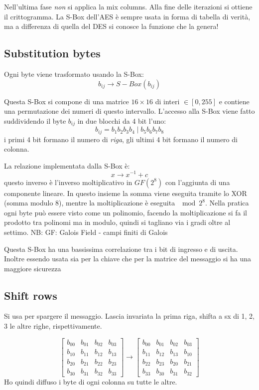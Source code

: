 Nell'ultima fase \emph{non} si applica la mix columns. Alla fine delle iterazioni si ottiene il crittogramma.
La S-Box dell'AES è sempre usata in forma di tabella di verità, ma a differenza di quella del DES si conosce la funzione che la genera!

\subsection{Substitution bytes}
Ogni byte viene trasformato usando la S-Box:
$$ b_{ij} \xrightarrow{} S-Box(b_{ij}) $$

Questa S-Box si compone di una matrice $16 \times 16$ di interi $\in [0, 255]$ e contiene una permutazione dei numeri di questo intervallo.
L'accesso alla S-Box viene fatto suddividendo il byte $b_{ij}$ in due blocchi da 4 bit l'uno:
$$ b_{ij} = b_{1}b_{2}b_{3}b_{4} \mid b_{5}b_{6}b_{7}b_{8} $$
i primi 4 bit formano il numero di \emph{riga}, gli ultimi 4 bit formano il numero di colonna.

La relazione implementata dalla S-Box è:
$$ x \xrightarrow{} x^{-1} + c $$
questo inverso è l'inverso moltiplicativo in $GF(2^{8})$ con l'aggiunta di una componente lineare.
In questo insieme la somma viene eseguita tramite lo XOR (somma modulo 8), mentre la moltiplicazione è eseguita $\mod 2^{8}$.
Nella pratica ogni byte può essere visto come un polinomio, facendo la moltiplicazione si fa il prodotto tra polinomi ma in modulo, quindi si tagliano via i gradi oltre al settimo.
NB: GF: Galois Field - campi finiti di Galois

Questa S-Box ha una bassissima correlazione tra i bit di ingresso e di uscita.
Inoltre essendo usata sia per la chiave che per la matrice del messaggio si ha una maggiore sicurezza

\subsection{Shift rows}
Si usa per spargere il messaggio.
Lascia invariata la prima riga, shifta a sx di 1, 2, 3 le altre righe, rispettivamente.

$$
    \begin{bmatrix}
        b_{00} & b_{01} & b_{02} & b_{03} \\
        b_{10} & b_{11} & b_{12} & b_{13} \\
        b_{20} & b_{21} & b_{22} & b_{23} \\
        b_{30} & b_{31} & b_{32} & b_{33}
    \end{bmatrix}
\xrightarrow{}
    \begin{bmatrix}
        b_{00} & b_{01} & b_{02} & b_{03} \\
        b_{11} & b_{12} & b_{13} & b_{10} \\
        b_{22} & b_{23} & b_{20} & b_{21} \\
        b_{33} & b_{30} & b_{31} & b_{32}
    \end{bmatrix}
$$
Ho quindi diffuso i byte di ogni colonna su tutte le altre.

